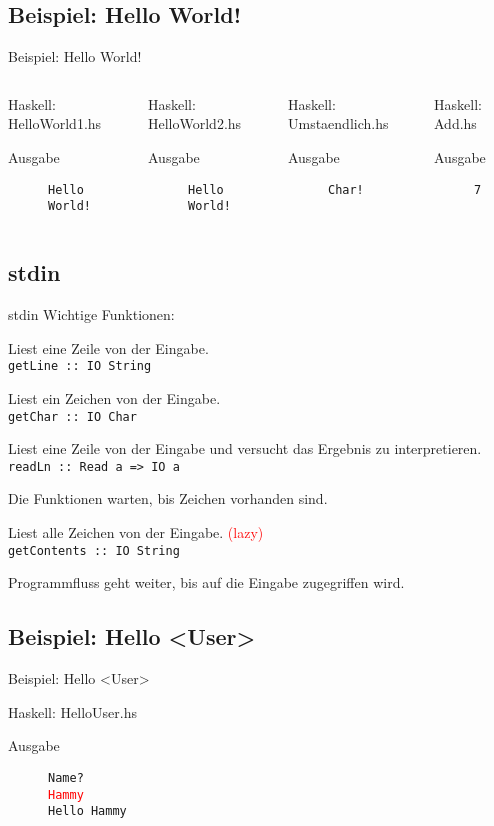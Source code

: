 \documentclass{beamer}
\newcommand{\outputcode}[3]
{
	\begin{block}{#1: #2}
	
	\begin{description}
	\item[Ausgabe]\texttt{#3}
	\end{description}
	\end{block}
}
\begin{document}
\subsection{Beispiel: Hello World!}
\begin{frame}[<+->][fragile]{Beispiel: Hello World!}
\tiny
\begin{columns}
\outputcode{Haskell}{HelloWorld1.hs}{Hello \\ World!}
\outputcode{Haskell}{HelloWorld2.hs}{Hello World!}
\outputcode{Haskell}{Umstaendlich.hs}{Char!}
\outputcode{Haskell}{Add.hs}{7}
\end{columns}
\end{frame}

\subsection{stdin}
\begin{frame}[<+->]{stdin}
Wichtige Funktionen:
\begin{description}
\item[getLine] Liest eine Zeile von der Eingabe. \\ \texttt{getLine :: IO String}
\item[getChar] Liest ein Zeichen von der Eingabe. \\ \texttt{getChar :: IO Char}
\item[readLn] Liest eine Zeile von der Eingabe und versucht das Ergebnis zu interpretieren. \\ \texttt{readLn :: Read a => IO a}
\item Die Funktionen warten, bis Zeichen vorhanden sind.
\item[getContents] Liest alle Zeichen von der Eingabe. \textcolor{red}{(lazy)}\\ \texttt{getContents :: IO String}
\item Programmfluss geht weiter, bis auf die Eingabe zugegriffen wird.
\end{description}
\end{frame}


\subsection{Beispiel: Hello <User>}
\begin{frame}[<+->][fragile]{Beispiel: Hello <User>}
\outputcode{Haskell}{HelloUser.hs}{Name?\\ \textcolor{red}{Hammy}\\Hello Hammy}
\end{frame}
\end{document}
